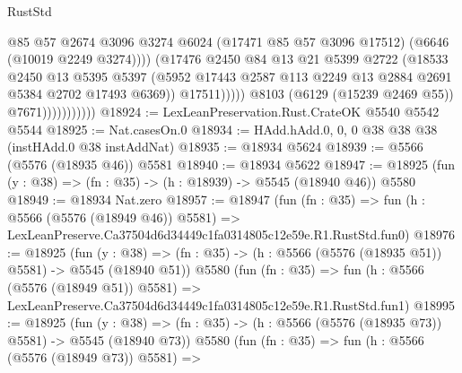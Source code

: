 \begin{lexlean}{RustStd}
\begin{coremodule}
                                      @85
                                      @57
                                      @2674
                                      @3096
                                      @3274
                                      @6024
                                      (@17471 @85 @57 @3096 @17512)
                                      (@6646 (@10019 @2249 @3274))))
                                  (@17476
                                    @2450
                                    @84
                                    @13
                                    @21
                                    @5399
                                    @2722
                                    (@18533
                                      @2450
                                      @13
                                      @5395
                                      @5397
                                      (@5952
                                        @17443
                                        @2587
                                        @113
                                        @2249
                                        @13
                                        @2884
                                        @2691
                                        @5384
                                        @2702
                                        @17493
                                        @6369))
                                    @17511)))))
                          @8103
                          (@6129 (@15239 @2469 @55))
                          @7671)))))))))))
@18924 := LexLeanPreservation.Rust.CrateOK @5540 @5542 @5544
@18925 := Nat.casesOn.{0}
@18934 := HAdd.hAdd.{0, 0, 0} @38 @38 @38 (instHAdd.{0} @38 instAddNat)
@18935 := @18934 @5624
@18939 := @5566 (@5576 (@18935 @46)) @5581
@18940 := @18934 @5622
@18947 := @18925 (fun (y : @38) => (fn : @35) -> (h : @18939) -> @5545 (@18940 @46)) @5580
@18949 := @18934 Nat.zero
@18957 := @18947
    (fun (fn : @35) =>
    fun (h : @5566 (@5576 (@18949 @46)) @5581) =>
    LexLeanPreserve.Ca37504d6d34449c1fa0314805c12e59e.R1.RustStd.fun0)
@18976 := @18925
    (fun (y : @38) => (fn : @35) -> (h : @5566 (@5576 (@18935 @51)) @5581) -> @5545 (@18940 @51))
    @5580
    (fun (fn : @35) =>
    fun (h : @5566 (@5576 (@18949 @51)) @5581) =>
    LexLeanPreserve.Ca37504d6d34449c1fa0314805c12e59e.R1.RustStd.fun1)
@18995 := @18925
    (fun (y : @38) => (fn : @35) -> (h : @5566 (@5576 (@18935 @73)) @5581) -> @5545 (@18940 @73))
    @5580
    (fun (fn : @35) =>
    fun (h : @5566 (@5576 (@18949 @73)) @5581) =>

\end{coremodule}
\end{lexlean}

